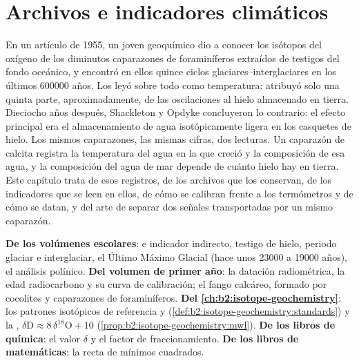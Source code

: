 \chapter{Archivos e indicadores climáticos}\label{ch:b2:climate-proxies}

En un artículo de 1955, un joven geoquímico dio a conocer los isótopos del oxígeno de los diminutos caparazones de
foraminíferos extraídos de testigos del fondo oceánico, y encontró en ellos quince ciclos glaciares--interglaciares en los
últimos \num{600000} años. Los leyó sobre todo como temperatura: atribuyó solo una quinta parte, aproximadamente, de
las oscilaciones al hielo almacenado en tierra. Dieciocho años después, Shackleton y Opdyke concluyeron lo
contrario: el efecto principal era el almacenamiento de agua isotópicamente ligera en los casquetes
de hielo. Los mismos caparazones, las mismas cifras, dos lecturas. Un caparazón de calcita registra la
temperatura del agua en la que creció y la composición de esa agua, y la composición del
agua de mar depende de cuánto hielo hay en tierra. Este capítulo trata de esos registros, de los
archivos que los conservan, de los indicadores que se leen en ellos, de cómo se calibran frente a los termómetros
y de cómo se datan, y del arte de separar dos señales transportadas por un mismo caparazón.

\begin{recall}
\textbf{De los volúmenes escolares}:  e indicador indirecto, testigo de hielo, periodo glaciar e
interglaciar, el Último Máximo Glacial (hace unos \num{23000} a \num{19000} años), el análisis
polínico. \textbf{Del volumen de primer año}: la datación radiométrica, la edad radiocarbono y su
curva de calibración; el fango calcáreo, formado por cocolitos y caparazones de foraminíferos.
\textbf{Del \cref{ch:b2:isotope-geochemistry}}: los patrones isotópicos de referencia  y 
(\cref{def:b2:isotope-geochemistry:standards}) y la , $\delta\mathrm{D}
\approx 8\,\delta^{18}\mathrm{O} + 10$ (\cref{prop:b2:isotope-geochemistry:mwl}). \textbf{De los
libros de química}: el valor $\delta$ y el factor de fraccionamiento. \textbf{De los libros de
matemáticas}: la recta de mínimos cuadrados.
\end{recall}

